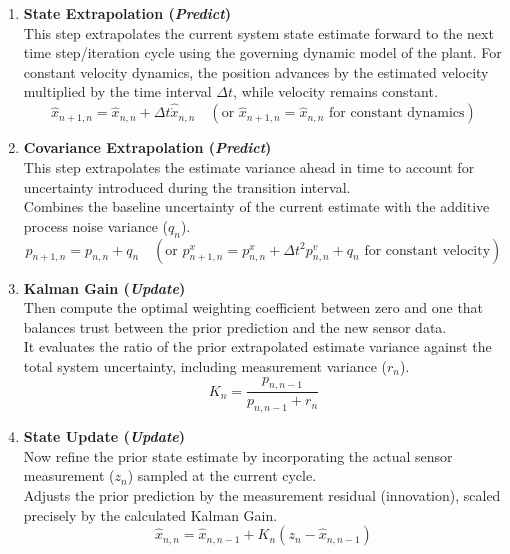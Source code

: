 \begin{enumerate}[label=\textbf{Step \arabic*:}, leftmargin=*, itemsep=1em]
	
	\item \textbf{State Extrapolation (\emph{Predict})}\\
	This step extrapolates the current system state estimate forward to the next time step/iteration cycle using the governing dynamic model of the plant. For constant velocity dynamics, the position advances by the estimated velocity multiplied by the time interval $\Delta t$, while velocity remains constant.
	\begin{equation}
		\hat{x}_{n+1,n} = \hat{x}_{n,n} + \Delta t \hat{\dot{x}}_{n,n} \quad (\text{or } \hat{x}_{n+1,n} = \hat{x}_{n,n} \text{ for constant dynamics})
	\end{equation}
	
	\item \textbf{Covariance Extrapolation (\emph{Predict})}\\
	This step extrapolates the estimate variance ahead in time to account for uncertainty introduced during the transition interval.%
	\\
	Combines the baseline uncertainty of the current estimate with the additive process noise variance ($q_n$).
	\begin{equation}
		p_{n+1,n} = p_{n,n} + q_n \quad (\text{or } p_{n+1,n}^x = p_{n,n}^x + \Delta t^2 p_{n,n}^v + q_n \text{ for constant velocity})
	\end{equation}
	
	\item \textbf{Kalman Gain (\emph{Update})}\\
	Then compute the optimal weighting coefficient between zero and one that balances trust between the prior prediction and the new sensor data.\\
	 It evaluates the ratio of the prior extrapolated estimate variance against the total system uncertainty, including measurement variance ($r_n$).
	\begin{equation}
		K_n = \frac{p_{n,n-1}}{p_{n,n-1} + r_n}
	\end{equation}
	
	\item \textbf{State Update (\emph{Update})}\\
	Now refine the prior state estimate by incorporating the actual sensor measurement ($z_n$) sampled at the current cycle.\\
	Adjusts the prior prediction by the measurement residual (innovation), scaled precisely by the calculated Kalman Gain.
	\begin{equation}
		\hat{x}_{n,n} = \hat{x}_{n,n-1} + K_n\left(z_n - \hat{x}_{n,n-1}\right)
	\end{equation}
	

\end{enumerate}
